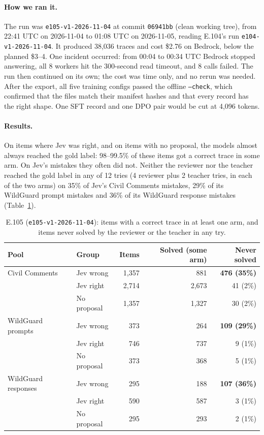 \documentclass[11pt]{article}
\renewcommand{\_}{\origunderscore\allowbreak}
\begin{document}
\paragraph{How we ran it.}
The run was \texttt{e105-v1-2026-11-04} at commit \texttt{06941bb} (clean working tree), from 22:41 UTC on 2026-11-04 to 01:08 UTC on 2026-11-05, reading E.104's run \texttt{e104-v1-2026-11-04}. It produced 38,036 traces and cost \$2.76 on Bedrock, below the planned \$3--4. One incident occurred: from 00:04 to 00:34 UTC Bedrock stopped answering, all 8 workers hit the 300-second read timeout, and 8 calls failed. The run then continued on its own; the cost was time only, and no rerun was needed. After the export, all five training configs passed the offline \texttt{--check}, which confirmed that the files match their manifest hashes and that every record has the right shape. One SFT record and one DPO pair would be cut at 4,096 tokens.

\paragraph{Results.}
On items where Jev was right, and on items with no proposal, the models almost always reached the gold label: 98--99.5\% of these items got a correct trace in some arm. On Jev's mistakes they often did not. Neither the reviewer nor the teacher reached the gold label in any of 12 tries (4 reviewer plus 2 teacher tries, in each of the two arms) on 35\% of Jev's Civil Comments mistakes, 29\% of its WildGuard prompt mistakes and 36\% of its WildGuard response mistakes (Table~\ref{tab:e105-solved}).

\begin{table}[H]
\centering
\small
\caption{E.105 (\texttt{e105-v1-2026-11-04}): items with a correct trace in at least one arm, and items never solved by the reviewer or the teacher in any try.}
\label{tab:e105-solved}
\begin{tabular}{llrrr}
\toprule
Pool & Group & Items & Solved (some arm) & Never solved \\
\midrule
Civil Comments & Jev wrong & 1,357 & 881 & \textbf{476 (35\%)} \\
 & Jev right & 2,714 & 2,673 & 41 (2\%) \\
 & No proposal & 1,357 & 1,327 & 30 (2\%) \\
\midrule
WildGuard prompts & Jev wrong & 373 & 264 & \textbf{109 (29\%)} \\
 & Jev right & 746 & 737 & 9 (1\%) \\
 & No proposal & 373 & 368 & 5 (1\%) \\
\midrule
WildGuard responses & Jev wrong & 295 & 188 & \textbf{107 (36\%)} \\
 & Jev right & 590 & 587 & 3 (1\%) \\
 & No proposal & 295 & 293 & 2 (1\%) \\
\bottomrule
\end{tabular}
\end{table}
\end{document}
